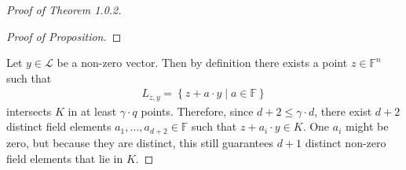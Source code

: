 \documentclass{memoir}
\begin{document}
\begin{proof}[Proof of Theorem 1.0.2]
\begin{proof}[Proof of Proposition]
\end{proof}
Let \(y \in \mathcal{L}\) be a non-zero vector. Then by definition there exists a point \(z \in \mathbb{F}^{n}\) such that
\begin{align*}
	L_{z,y} = \left\{z + a\cdot y \mid a \in \mathbb{F} \right\} 
\end{align*}
intersects \(K\) in at least \(\gamma \cdot q\) points. Therefore, since \(d+2 \leq \gamma \cdot d\), there exist \(d+2\) distinct field elements \(a_1,\ldots,a_{d+2} \in \mathbb{F}\) such that \(z+a_i \cdot y \in K\). One \(a_i\) might be zero, but because they are distinct, this still guarantees \(d+1\) distinct non-zero field elements that lie in \(K\).

\end{proof}
\end{document}
